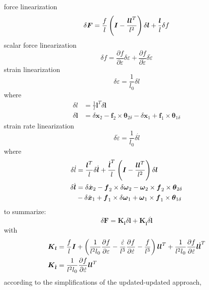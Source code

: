 \documentclass[10pt,dvips,fleqn,subeqn]{report}
\newcommand{\T}[1]{\boldsymbol{#1}}
\begin{document}
force linearization
\begin{equation}
	\delta\T{F} = \frac{f}{l}\plbr{\T{I} - \frac{\T{l}\T{l}^T}{l^2}} \delta\T{l} + \frac{\T{l}}{l} \delta{f}
\end{equation}
scalar force linearization
\begin{equation}
	\delta{f} = \frac{\partial{f}}{\partial\varepsilon} \delta\varepsilon
	+ \frac{\partial{f}}{\partial\dot{\varepsilon}} \delta\dot{\varepsilon}
\end{equation}
strain linearization
\begin{equation}
	\delta\varepsilon = \frac{1}{l_0}\delta{l}
\end{equation}
where
\begin{align}
	\delta{l} &= \frac{1}{l}\T{l}^T \delta\T{l} \\
	\delta\T{l} &= \delta\T{x}_2 - \T{f}_2 \times \T{\theta}_{2\delta}
		- \delta\T{x}_1 + \T{f}_1 \times \T{\theta}_{1\delta}
\end{align}
strain rate linearization
\begin{equation}
	\delta\dot{\varepsilon} = \frac{1}{l_0} \delta\dot{l}
\end{equation}
where
\begin{align}
	\delta\dot{l} &= \frac{\T{l}^T}{l} \delta\dot{\T{l}}
		+ \frac{\dot{\T{l}}^T}{l}\plbr{\T{I} - \frac{\T{l}\T{l}^T}{l^2}} \delta\T{l} \\
	\delta\dot{\T{l}} &= \delta\dot{\T{x}}_2
		- \T{f}_2 \times \delta\T{\omega}_2 - \T{\omega}_2 \times \T{f}_2 \times \T{\theta}_{2\delta}
		\nonumber \\
		& \mbox{} - \delta\dot{\T{x}}_1
		+ \T{f}_1 \times \delta\T{\omega}_1 + \T{\omega}_1 \times \T{f}_1 \times \T{\theta}_{1\delta}
\end{align}
to summarize:
\begin{equation}
	\delta\T{F} = \T{K}_{\T{l}} \delta\T{l} + \T{K}_{\dot{\T{l}}} \delta\dot{\T{l}}
\end{equation}
with
\begin{align}
	\T{K}_{\T{l}} &= \frac{f}{l} \T{I}
		+ \plbr{
			\frac{1}{l^2 l_0} \frac{\partial{f}}{\partial\varepsilon}
			- \frac{\dot{\varepsilon}}{l^3} \frac{\partial{f}}{\partial\dot{\varepsilon}}
			- \frac{f}{l^3}
		}\T{l}\T{l}^T
		+ \frac{1}{l^2 l_0} \frac{\partial{f}}{\partial\dot{\varepsilon}} \T{l}\dot{\T{l}}^T \\
	\T{K}_{\dot{\T{l}}} &= \frac{1}{l^2 l_0} \frac{\partial{f}}{\partial\dot{\varepsilon}} \T{l}\T{l}^T
\end{align}
according to the simplifications of the updated-updated approach,
\end{document}
